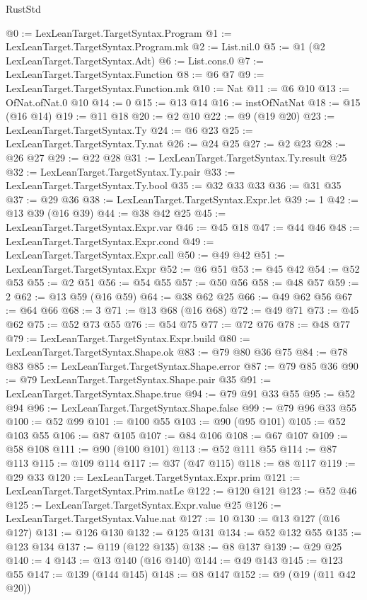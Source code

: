 \begin{lexlean}{RustStd}
\begin{coremodule}
@0 := LexLeanTarget.TargetSyntax.Program
@1 := LexLeanTarget.TargetSyntax.Program.mk
@2 := List.nil.{0}
@5 := @1 (@2 LexLeanTarget.TargetSyntax.Adt)
@6 := List.cons.{0}
@7 := LexLeanTarget.TargetSyntax.Function
@8 := @6 @7
@9 := LexLeanTarget.TargetSyntax.Function.mk
@10 := Nat
@11 := @6 @10
@13 := OfNat.ofNat.{0} @10
@14 := 0
@15 := @13 @14
@16 := instOfNatNat
@18 := @15 (@16 @14)
@19 := @11 @18
@20 := @2 @10
@22 := @9 (@19 @20)
@23 := LexLeanTarget.TargetSyntax.Ty
@24 := @6 @23
@25 := LexLeanTarget.TargetSyntax.Ty.nat
@26 := @24 @25
@27 := @2 @23
@28 := @26 @27
@29 := @22 @28
@31 := LexLeanTarget.TargetSyntax.Ty.result @25
@32 := LexLeanTarget.TargetSyntax.Ty.pair
@33 := LexLeanTarget.TargetSyntax.Ty.bool
@35 := @32 @33 @33
@36 := @31 @35
@37 := @29 @36
@38 := LexLeanTarget.TargetSyntax.Expr.let
@39 := 1
@42 := @13 @39 (@16 @39)
@44 := @38 @42 @25
@45 := LexLeanTarget.TargetSyntax.Expr.var
@46 := @45 @18
@47 := @44 @46
@48 := LexLeanTarget.TargetSyntax.Expr.cond
@49 := LexLeanTarget.TargetSyntax.Expr.call
@50 := @49 @42
@51 := LexLeanTarget.TargetSyntax.Expr
@52 := @6 @51
@53 := @45 @42
@54 := @52 @53
@55 := @2 @51
@56 := @54 @55
@57 := @50 @56
@58 := @48 @57
@59 := 2
@62 := @13 @59 (@16 @59)
@64 := @38 @62 @25
@66 := @49 @62 @56
@67 := @64 @66
@68 := 3
@71 := @13 @68 (@16 @68)
@72 := @49 @71
@73 := @45 @62
@75 := @52 @73 @55
@76 := @54 @75
@77 := @72 @76
@78 := @48 @77
@79 := LexLeanTarget.TargetSyntax.Expr.build
@80 := LexLeanTarget.TargetSyntax.Shape.ok
@83 := @79 @80 @36 @75
@84 := @78 @83
@85 := LexLeanTarget.TargetSyntax.Shape.error
@87 := @79 @85 @36
@90 := @79 LexLeanTarget.TargetSyntax.Shape.pair @35
@91 := LexLeanTarget.TargetSyntax.Shape.true
@94 := @79 @91 @33 @55
@95 := @52 @94
@96 := LexLeanTarget.TargetSyntax.Shape.false
@99 := @79 @96 @33 @55
@100 := @52 @99
@101 := @100 @55
@103 := @90 (@95 @101)
@105 := @52 @103 @55
@106 := @87 @105
@107 := @84 @106
@108 := @67 @107
@109 := @58 @108
@111 := @90 (@100 @101)
@113 := @52 @111 @55
@114 := @87 @113
@115 := @109 @114
@117 := @37 (@47 @115)
@118 := @8 @117
@119 := @29 @33
@120 := LexLeanTarget.TargetSyntax.Expr.prim
@121 := LexLeanTarget.TargetSyntax.Prim.natLe
@122 := @120 @121
@123 := @52 @46
@125 := LexLeanTarget.TargetSyntax.Expr.value @25
@126 := LexLeanTarget.TargetSyntax.Value.nat
@127 := 10
@130 := @13 @127 (@16 @127)
@131 := @126 @130
@132 := @125 @131
@134 := @52 @132 @55
@135 := @123 @134
@137 := @119 (@122 @135)
@138 := @8 @137
@139 := @29 @25
@140 := 4
@143 := @13 @140 (@16 @140)
@144 := @49 @143
@145 := @123 @55
@147 := @139 (@144 @145)
@148 := @8 @147
@152 := @9 (@19 (@11 @42 @20))

\end{coremodule}
\end{lexlean}
